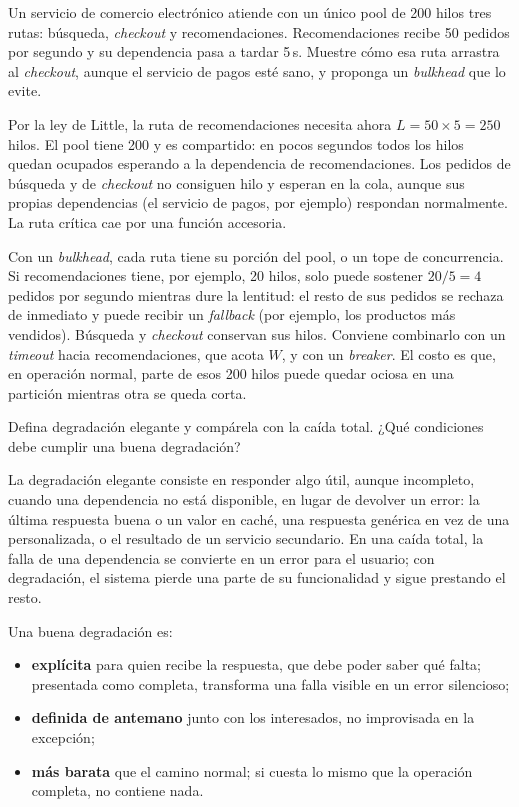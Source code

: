 \documentclass[variant=guia,cover=institutional,mode=screen]{ua-engineering-v6-article}
\begin{document}
\begin{uaexercise}
Un servicio de comercio electrónico atiende con un único pool de 200 hilos tres rutas: búsqueda, \emph{checkout} y recomendaciones. Recomendaciones recibe 50 pedidos por segundo y su dependencia pasa a tardar 5\,s. Muestre cómo esa ruta arrastra al \emph{checkout}, aunque el servicio de pagos esté sano, y proponga un \emph{bulkhead} que lo evite.
\end{uaexercise}
\begin{uaanswer}
Por la ley de Little, la ruta de recomendaciones necesita ahora $L = 50 \times 5 = 250$ hilos. El pool tiene 200 y es compartido: en pocos segundos todos los hilos quedan ocupados esperando a la dependencia de recomendaciones. Los pedidos de búsqueda y de \emph{checkout} no consiguen hilo y esperan en la cola, aunque sus propias dependencias (el servicio de pagos, por ejemplo) respondan normalmente. La ruta crítica cae por una función accesoria.

Con un \emph{bulkhead}, cada ruta tiene su porción del pool, o un tope de concurrencia. Si recomendaciones tiene, por ejemplo, 20 hilos, solo puede sostener $20 / 5 = 4$ pedidos por segundo mientras dure la lentitud: el resto de sus pedidos se rechaza de inmediato y puede recibir un \emph{fallback} (por ejemplo, los productos más vendidos). Búsqueda y \emph{checkout} conservan sus hilos. Conviene combinarlo con un \emph{timeout} hacia recomendaciones, que acota $W$, y con un \emph{breaker}. El costo es que, en operación normal, parte de esos 200 hilos puede quedar ociosa en una partición mientras otra se queda corta.
\end{uaanswer}

\begin{uaexercise}
Defina degradación elegante y compárela con la caída total. ¿Qué condiciones debe cumplir una buena degradación?
\end{uaexercise}
\begin{uaanswer}
La degradación elegante consiste en responder algo útil, aunque incompleto, cuando una dependencia no está disponible, en lugar de devolver un error: la última respuesta buena o un valor en caché, una respuesta genérica en vez de una personalizada, o el resultado de un servicio secundario. En una caída total, la falla de una dependencia se convierte en un error para el usuario; con degradación, el sistema pierde una parte de su funcionalidad y sigue prestando el resto.

Una buena degradación es:
\begin{itemize}
\item \textbf{explícita} para quien recibe la respuesta, que debe poder saber qué falta; presentada como completa, transforma una falla visible en un error silencioso;
\item \textbf{definida de antemano} junto con los interesados, no improvisada en la excepción;
\item \textbf{más barata} que el camino normal; si cuesta lo mismo que la operación completa, no contiene nada.
\end{itemize}
\end{uaanswer}
\end{document}
